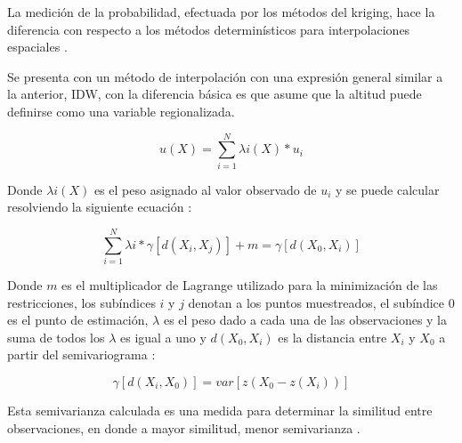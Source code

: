 La medición de la probabilidad, efectuada por los métodos del kriging, hace la diferencia con
respecto a los métodos determinísticos para interpolaciones espaciales
\citep{villatoro2007comparacion}.

Se presenta con un método de interpolación con una expresión general similar a la anterior, IDW,
con la diferencia básica es que asume que la altitud puede definirse como una variable
regionalizada.

\begin{equation}\label{eq:interpolacion-kriging}
 u(X) = \sum_{i=1}^{N} \lambda{i}(X) * u_{i}
\end{equation}

Donde $\lambda{i}(X)$ es el peso asignado al valor observado de $u_{i}$ y se puede calcular
resolviendo la siguiente ecuación :

\begin{equation}\label{eq:interpolacion-peso-kriging}
\sum_{i=1}^{N} \lambda{i}  * \gamma[d(X_{i}, X_{j})] + m = \gamma[d(X_{0}, X_{i})]
\end{equation}

Donde $m$ es el multiplicador de Lagrange utilizado para la minimización de las restricciones,
los subíndices $i$ y $j$ denotan a los puntos muestreados, el subíndice $0$ es el punto de
estimación, $\lambda$ es el peso dado a cada una de las observaciones y la suma de todos los
$\lambda$ es igual a uno y $d(X_{0}, X_{i})$ es la distancia entre $X_{i}$ y $X_{0}$ a partir del
semivariograma \citep{villatoro2007comparacion}:

\begin{equation}\label{eq:interpolacion-semivariograma}
\gamma[d(X_{i}, X_{0})] = var[z(X_{0} - z(X_{i}))]
\end{equation}

Esta semivarianza calculada es una medida para determinar la similitud entre observaciones, en
donde a mayor similitud, menor semivarianza \citep{villatoro2007comparacion}.
